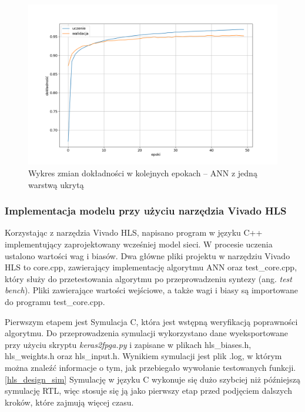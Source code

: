 \begin{figure}[!h]
  \centering
  \includegraphics[width=\textwidth]{img/keras-accuracy1.png}
  \caption{Wykres zmian dokładności w kolejnych epokach -- ANN z jedną warstwą ukrytą}
  \label{keras-accuracy1}
\end{figure}


\subsubsection{Implementacja modelu przy użyciu narzędzia Vivado HLS}

Korzystając z narzędzia Vivado HLS, napisano program w języku C++ implementujący 
zaprojektowany wcześniej model sieci. W procesie uczenia ustalono wartości wag i 
biasów. Dwa główne pliki projektu w narzędziu Vivado HLS to core.cpp, zawierający 
implementację algorytmu ANN oraz test\_core.cpp, który służy do przetestowania
algorytmu po przeprowadzeniu syntezy (ang. \emph{test bench}).   
Pliki zawierające wartości wejściowe, a także wagi i biasy są importowane 
do programu test\_core.cpp. 

Pierwszym etapem jest Symulacja C, która jest wstępną weryfikacją poprawności
algorytmu. Do przeprowadzenia symulacji wykorzystano dane wyeksportowane przy użyciu 
skryptu \emph{keras2fpga.py} i zapisane w plikach hls\_biases.h, hls\_weights.h oraz 
hls\_input.h. Wynikiem symulacji jest plik .log, w którym można znaleźć informacje o
tym, jak przebiegało wywołanie testowanych funkcji.\ref{hls_design_sim}
Symulację w języku C wykonuje się dużo szybciej niż późniejszą symulację RTL, więc
stosuje się ją jako pierwszy etap przed podjęciem dalszych kroków, które zajmują 
więcej czasu.

